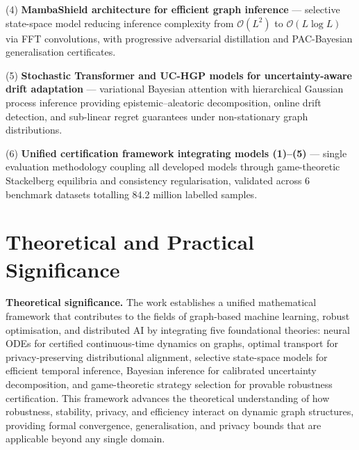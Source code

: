 (4) \textbf{MambaShield architecture for efficient graph inference} --- selective state-space model reducing inference complexity from $\mathcal{O}(L^{2})$ to $\mathcal{O}(L\log L)$ via FFT convolutions, with progressive adversarial distillation and PAC-Bayesian generalisation certificates.

(5) \textbf{Stochastic Transformer and UC-HGP models for uncertainty-aware drift adaptation} --- variational Bayesian attention with hierarchical Gaussian process inference providing epistemic--aleatoric decomposition, online drift detection, and sub-linear regret guarantees under non-stationary graph distributions.

(6) \textbf{Unified certification framework integrating models (1)--(5)} --- single evaluation methodology coupling all developed models through game-theoretic Stackelberg equilibria and consistency regularisation, validated across 6 benchmark datasets totalling 84.2 million labelled samples.

\section*{Theoretical and Practical Significance}

\textbf{Theoretical significance.} The work establishes a unified mathematical framework that contributes to the fields of graph-based machine learning, robust optimisation, and distributed AI by integrating five foundational theories: neural ODEs for certified continuous-time dynamics on graphs, optimal transport for privacy-preserving distributional alignment, selective state-space models for efficient temporal inference, Bayesian inference for calibrated uncertainty decomposition, and game-theoretic strategy selection for provable robustness certification. This framework advances the theoretical understanding of how robustness, stability, privacy, and efficiency interact on dynamic graph structures, providing formal convergence, generalisation, and privacy bounds that are applicable beyond any single domain.

